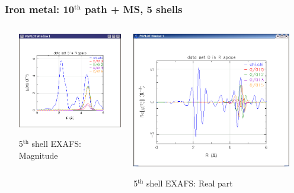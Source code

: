 \documentclass[10pt, xcolor=x11names, compress]{beamer}
\begin{document}
\begin{frame}
  \frametitle{Iron metal: 10$^{\mathrm{th}}$ path + MS, 5 shells}
  \begin{columns}[T]
    \begin{column}{0.1\linewidth}
      ~
    \end{column}
    \begin{column}{0.4\linewidth}
      \includegraphics[width=0.8\linewidth]{images/path10}

      5$^{\mathrm{th}}$ shell EXAFS: Magnitude
    \end{column}
    \begin{column}{0.4\linewidth}
      \includegraphics[width=0.8\linewidth]{images/path10_re}

      5$^{\mathrm{th}}$ shell EXAFS: Real part
    \end{column}
    \begin{column}{0.1\linewidth}
      ~
    \end{column}
  \end{columns}    


\end{frame}
\end{document}

